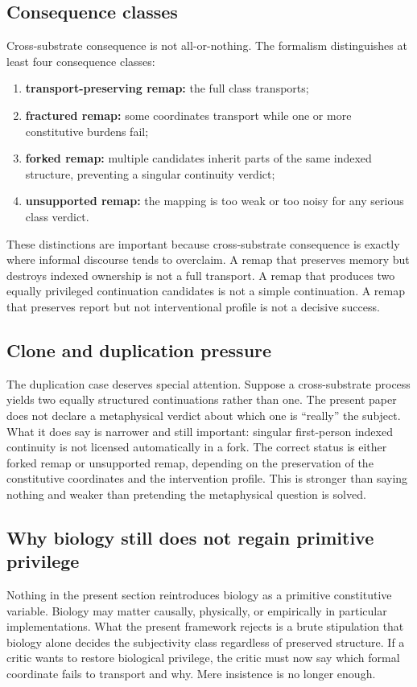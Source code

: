\documentclass[11pt,a4paper]{article}
\theoremstyle{definition}
\begin{document}
\subsection{Consequence classes}
Cross-substrate consequence is not all-or-nothing. The formalism distinguishes at least four consequence classes:
\begin{enumerate}[leftmargin=1.5em]
\item \textbf{transport-preserving remap:} the full class transports;
\item \textbf{fractured remap:} some coordinates transport while one or more constitutive burdens fail;
\item \textbf{forked remap:} multiple candidates inherit parts of the same indexed structure, preventing a singular continuity verdict;
\item \textbf{unsupported remap:} the mapping is too weak or too noisy for any serious class verdict.
\end{enumerate}

These distinctions are important because cross-substrate consequence is exactly where informal discourse tends to overclaim. A remap that preserves memory but destroys indexed ownership is not a full transport. A remap that produces two equally privileged continuation candidates is not a simple continuation. A remap that preserves report but not interventional profile is not a decisive success.

\subsection{Clone and duplication pressure}
The duplication case deserves special attention. Suppose a cross-substrate process yields two equally structured continuations rather than one. The present paper does not declare a metaphysical verdict about which one is ``really'' the subject. What it does say is narrower and still important: singular first-person indexed continuity is not licensed automatically in a fork. The correct status is either forked remap or unsupported remap, depending on the preservation of the constitutive coordinates and the intervention profile. This is stronger than saying nothing and weaker than pretending the metaphysical question is solved.

\subsection{Why biology still does not regain primitive privilege}
Nothing in the present section reintroduces biology as a primitive constitutive variable. Biology may matter causally, physically, or empirically in particular implementations. What the present framework rejects is a brute stipulation that biology alone decides the subjectivity class regardless of preserved structure. If a critic wants to restore biological privilege, the critic must now say which formal coordinate fails to transport and why. Mere insistence is no longer enough.
\end{document}
